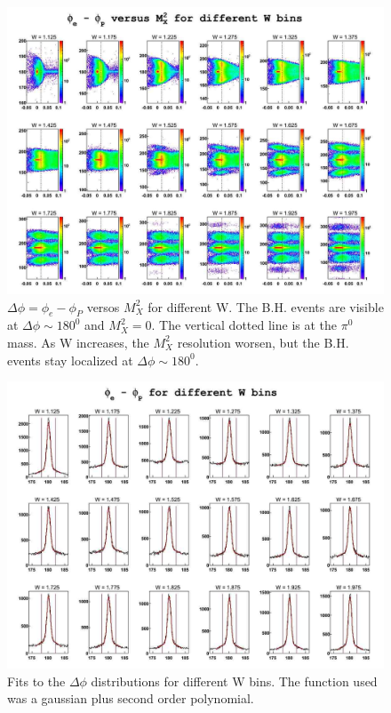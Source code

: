\begin{landscape}
	\begin{figure}[ht]
	\centering
		\includegraphics[width=1.15\textheight]{img/dphi_epXmm2_no_cut.jpg}
		\caption{$\Delta\phi = \phi_e-\phi_P$ versos $M_X^2$ for different W. The B.H. events
		are visible at $\Delta\phi \sim 180^0$ and $M_X^2 = 0$. The vertical dotted line is at the
		$\pi^0$ mass. As W increases, the $M_X^2$ resolution worsen, but the B.H. events
		stay localized at $\Delta\phi \sim 180^0$.}
		\label{fig:dphi_epXmm2_no_cut}
	\end{figure}
\end{landscape}
\clearpage\newpage

\begin{landscape}
	\begin{figure}[ht]
	\centering
		\includegraphics[width=1.15\textheight]{img/dphi_no_cut.jpg}
		\caption{Fits to the $\Delta\phi$ distributions for different W bins. The function used was
		a gaussian plus second order polynomial.}
		\label{fig:dphi_no_cut}
	\end{figure}
\end{landscape}

